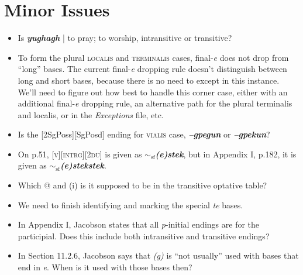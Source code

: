 \documentclass{article}
\begin{document}
\section{Minor Issues}

\begin{itemize}
\renewcommand\labelitemi{$\cdot$}

\item Is \textit{\textbf{yughagh}} | to pray; to worship, intransitive or transitive?

\item To form the plural \textsc{localis} and \textsc{terminalis} cases, final-\textit{e} does not drop from ``long'' bases.
%
The current final-\textit{e} dropping rule doesn't distinguish between long and short bases, because there is no need to except in this instance.
%
We'll need to figure out how best to handle this corner case, either with an additional final-\textit{e} dropping rule, an alternative path for the plural terminalis and localis, or in the \textit{Exceptions} file, etc.

\item Is the [2SgPoss][SgPosd] ending for \textsc{vialis} case, \textit{\textbf{--gpegun}} or \textit{\textbf{--gpekun}}?

\item On p.51, \textsc{[v][intrg][2du]} is given as \textit{\textbf{$\sim_\text{sf}$(e)stek}}, but in Appendix I, p.182, it is given as \textit{\textbf{$\sim_\text{sf}$(e)stekstek}}.

\item Which @ and (i) is it supposed to be in the transitive optative table?

\item We need to finish identifying and marking the special \textit{te} bases.

\item In Appendix I, Jacobson states that all \textit{p}-initial endings are for the participial.
%
Does this include both intransitive and transitive endings?

\item In Section 11.2.6, Jacobson says that \textit{(g)} is ``not usually'' used with bases that end in \textit{e}.
%
When is it used with those bases then?

\end{itemize}
\end{document}
